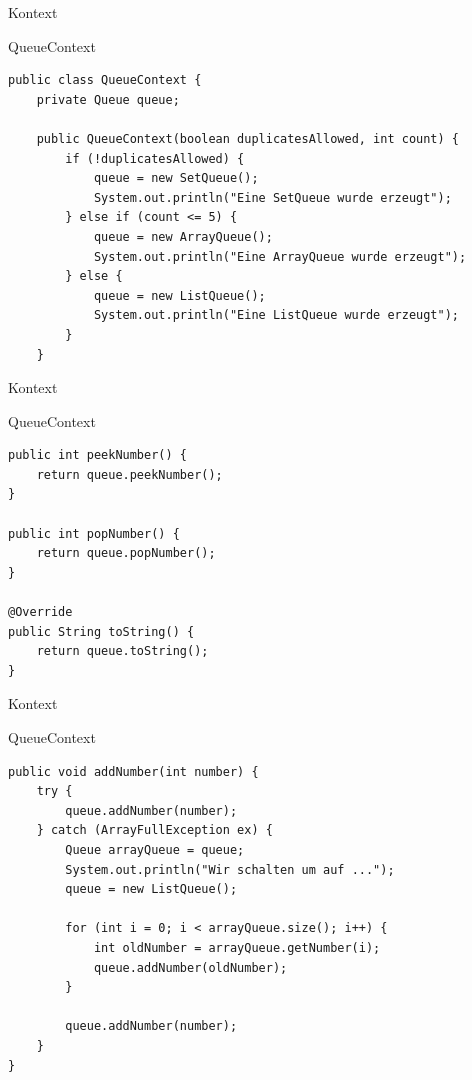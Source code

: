 \begin{frame}[fragile]{Kontext}
	\begin{exampleblock}{QueueContext}
        \begin{lstlisting}
public class QueueContext {
	private Queue queue;
	
	public QueueContext(boolean duplicatesAllowed, int count) {
		if (!duplicatesAllowed) {
			queue = new SetQueue();
			System.out.println("Eine SetQueue wurde erzeugt");
		} else if (count <= 5) {
			queue = new ArrayQueue();
			System.out.println("Eine ArrayQueue wurde erzeugt");
		} else {
			queue = new ListQueue();
			System.out.println("Eine ListQueue wurde erzeugt");
		}
	}
        \end{lstlisting}
 	\end{exampleblock}
\end{frame}

\begin{frame}[fragile]{Kontext}
	\begin{exampleblock}{QueueContext}
        \begin{lstlisting}
public int peekNumber() {
    return queue.peekNumber();
}

public int popNumber() {
    return queue.popNumber();
}

@Override
public String toString() {
    return queue.toString();
}
        \end{lstlisting}
 	\end{exampleblock}
\end{frame}

\begin{frame}[fragile]{Kontext}
	\begin{exampleblock}{QueueContext}
        \begin{lstlisting}
public void addNumber(int number) {
    try {
        queue.addNumber(number);
    } catch (ArrayFullException ex) {
        Queue arrayQueue = queue;
        System.out.println("Wir schalten um auf ...");
        queue = new ListQueue();
        
        for (int i = 0; i < arrayQueue.size(); i++) {
            int oldNumber = arrayQueue.getNumber(i);
            queue.addNumber(oldNumber);
        }
        
        queue.addNumber(number);
    }
}
        \end{lstlisting}
 	\end{exampleblock}
\end{frame}

